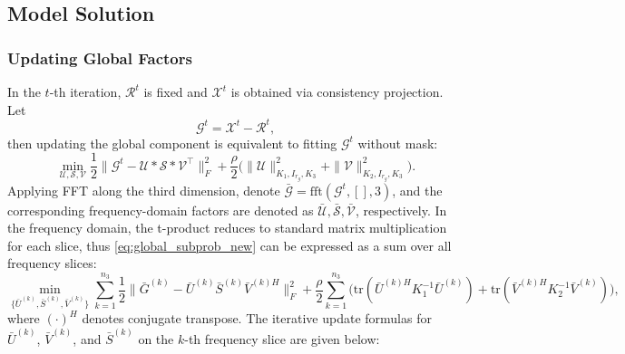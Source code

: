 \documentclass[a4paper,12pt]{article}
\numberwithin{equation}{section}
\numberwithin{algorithm}{section}
\theoremstyle{remark}
\theoremstyle{definition}
\begin{document}
\subsection{Model Solution}
\label{sec:solution}

\subsubsection{Updating Global Factors}
In the $t$-th iteration, $\mathcal{R}^t$ is fixed and $\mathcal{X}^t$ is obtained via consistency projection. Let
\[
\mathcal{G}^t=\mathcal{X}^t-\mathcal{R}^t,
\]
then updating the global component is equivalent to fitting $\mathcal{G}^t$ without mask:
\begin{equation}
	\min_{\mathcal{U},\mathcal{S},\mathcal{V}}
	\frac12\big\|\mathcal{G}^t-\mathcal{U}*\mathcal{S}*\mathcal{V}^{\top}\big\|_F^2
	+\frac{\rho}{2}\Big(\|\mathcal{U}\|^{2}_{K_1,I_{r_g},K_3}+\|\mathcal{V}\|^{2}_{K_2,I_{r_g},K_3}\Big).
	\label{eq:global_subprob_new}
\end{equation}
Applying FFT along the third dimension, denote $\bar{\mathcal{G}}=\mathrm{fft}(\mathcal{G}^t,[],3)$, and the corresponding frequency-domain factors are denoted as $\bar{\mathcal{U}},\bar{\mathcal{S}},\bar{\mathcal{V}}$, respectively.
In the frequency domain, the  t-product reduces to standard matrix multiplication for each slice, thus \eqref{eq:global_subprob_new} can be expressed as a sum over all frequency slices:
\begin{equation}
	\min_{\{\bar U^{(k)},\bar S^{(k)},\bar V^{(k)}\}}
	\sum_{k=1}^{n_3}\frac12\big\|\bar G^{(k)}-\bar U^{(k)}\bar S^{(k)}\bar V^{(k)H}\big\|_F^2
	+\frac{\rho}{2}\sum_{k=1}^{n_3}\Big(\mathrm{tr}(\bar U^{(k)H}K_1^{-1}\bar U^{(k)})+\mathrm{tr}(\bar V^{(k)H}K_2^{-1}\bar V^{(k)})\Big),
	\label{eq:global_freq_sum}
\end{equation}
where $(\cdot)^H$ denotes conjugate transpose. The iterative update formulas for $\bar U^{(k)}$, $\bar V^{(k)}$, and $\bar S^{(k)}$ on the $k$-th frequency slice are given below:
\end{document}
